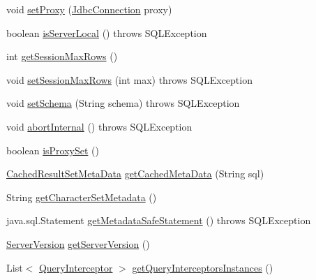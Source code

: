 \begin{DoxyCompactItemize}
\item 
void \mbox{\hyperlink{interfacecom_1_1mysql_1_1cj_1_1jdbc_1_1_jdbc_connection_a48162c9f0bf249804ae60cb7404cd0f8}{set\+Proxy}} (\mbox{\hyperlink{interfacecom_1_1mysql_1_1cj_1_1jdbc_1_1_jdbc_connection}{Jdbc\+Connection}} proxy)
\item 
boolean \mbox{\hyperlink{interfacecom_1_1mysql_1_1cj_1_1jdbc_1_1_jdbc_connection_a4418f89cdbd768f892b6ef7823107921}{is\+Server\+Local}} ()  throws S\+Q\+L\+Exception
\item 
int \mbox{\hyperlink{interfacecom_1_1mysql_1_1cj_1_1jdbc_1_1_jdbc_connection_ab5a06def600625b8d101a40023ff2856}{get\+Session\+Max\+Rows}} ()
\item 
void \mbox{\hyperlink{interfacecom_1_1mysql_1_1cj_1_1jdbc_1_1_jdbc_connection_aec5eb42d9facdbd97b0a5238022af05d}{set\+Session\+Max\+Rows}} (int max)  throws S\+Q\+L\+Exception
\item 
void \mbox{\hyperlink{interfacecom_1_1mysql_1_1cj_1_1jdbc_1_1_jdbc_connection_a7f187665ea1dcc0a9a77cdc7cb56dc52}{set\+Schema}} (String schema)  throws S\+Q\+L\+Exception
\item 
void \mbox{\hyperlink{interfacecom_1_1mysql_1_1cj_1_1jdbc_1_1_jdbc_connection_afc07faaedcdfc3be9fa9bfcf751b673a}{abort\+Internal}} ()  throws S\+Q\+L\+Exception
\item 
boolean \mbox{\hyperlink{interfacecom_1_1mysql_1_1cj_1_1jdbc_1_1_jdbc_connection_abf3c640bcdbc0839cd67ed0e9b7d94a1}{is\+Proxy\+Set}} ()
\item 
\mbox{\hyperlink{interfacecom_1_1mysql_1_1cj_1_1jdbc_1_1result_1_1_cached_result_set_meta_data}{Cached\+Result\+Set\+Meta\+Data}} \mbox{\hyperlink{interfacecom_1_1mysql_1_1cj_1_1jdbc_1_1_jdbc_connection_a248df459ef314e3a79257c7bd6dc560a}{get\+Cached\+Meta\+Data}} (String sql)
\item 
String \mbox{\hyperlink{interfacecom_1_1mysql_1_1cj_1_1jdbc_1_1_jdbc_connection_a1bf742d4ab1a9e354ab3c810caa40481}{get\+Character\+Set\+Metadata}} ()
\item 
java.\+sql.\+Statement \mbox{\hyperlink{interfacecom_1_1mysql_1_1cj_1_1jdbc_1_1_jdbc_connection_ab48793a6beae119da08e7ae9e982c6c0}{get\+Metadata\+Safe\+Statement}} ()  throws S\+Q\+L\+Exception
\item 
\mbox{\hyperlink{classcom_1_1mysql_1_1cj_1_1_server_version}{Server\+Version}} \mbox{\hyperlink{interfacecom_1_1mysql_1_1cj_1_1jdbc_1_1_jdbc_connection_a463e239b2b6901e85834e64ebda84d0c}{get\+Server\+Version}} ()
\item 
List$<$ \mbox{\hyperlink{interfacecom_1_1mysql_1_1cj_1_1interceptors_1_1_query_interceptor}{Query\+Interceptor}} $>$ \mbox{\hyperlink{interfacecom_1_1mysql_1_1cj_1_1jdbc_1_1_jdbc_connection_a06e9e0a4a916223a7b1582f10b8fdb5d}{get\+Query\+Interceptors\+Instances}} ()

\end{DoxyCompactItemize}
